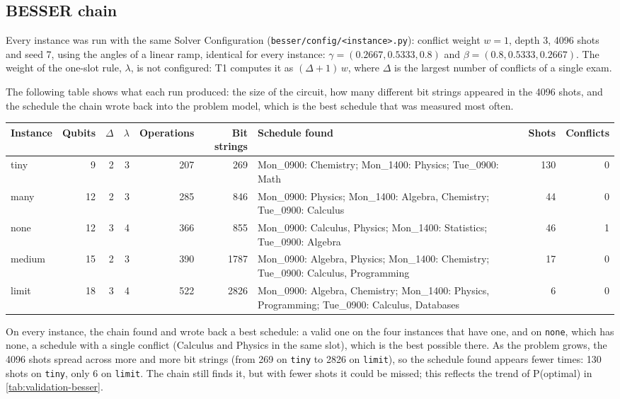\subsection*{BESSER chain}

Every instance was run with the same Solver Configuration (\texttt{besser/config/<instance>.py}): conflict weight $w = 1$, depth 3, 4096 shots and seed 7, using the angles of a linear ramp, identical for every instance: $\gamma = (0.2667, 0.5333, 0.8)$ and $\beta = (0.8, 0.5333, 0.2667)$. The weight of the one-slot rule, $\lambda$, is not configured: T1 computes it as $(\Delta + 1)\,w$, where $\Delta$ is the largest number of conflicts of a single exam.

The following table shows what each run produced: the size of the circuit, how many different bit strings appeared in the 4096 shots, and the schedule the chain wrote back into the problem model, which is the best schedule that was measured most often.

\begin{table}
	\label{tab:results-besser}
	\footnotesize
	\begin{tabularx}{\linewidth}{@{}lrrrrr>{\raggedright\arraybackslash}Xrr@{}}
		\toprule
		Instance & Qubits & $\Delta$ & $\lambda$ & Operations & Bit strings & Schedule found & Shots & Conflicts \\
		\midrule
		tiny   & 9  & 2 & 3 & 207 & 269  & Mon\_0900: Chemistry; Mon\_1400: Physics; Tue\_0900: Math                                    & 130 & 0 \\
		many   & 12 & 2 & 3 & 285 & 846  & Mon\_0900: Physics; Mon\_1400: Algebra, Chemistry; Tue\_0900: Calculus                       & 44  & 0 \\
		none   & 12 & 3 & 4 & 366 & 855  & Mon\_0900: Calculus, Physics; Mon\_1400: Statistics; Tue\_0900: Algebra                      & 46  & 1 \\
		medium & 15 & 2 & 3 & 390 & 1787 & Mon\_0900: Algebra, Physics; Mon\_1400: Chemistry; Tue\_0900: Calculus, Programming          & 17  & 0 \\
		limit  & 18 & 3 & 4 & 522 & 2826 & Mon\_0900: Algebra, Chemistry; Mon\_1400: Physics, Programming; Tue\_0900: Calculus, Databases & 6   & 0 \\
		\bottomrule
	\end{tabularx}
\end{table}

On every instance, the chain found and wrote back a best schedule: a valid one on the four instances that have one, and on \texttt{none}, which has none, a schedule with a single conflict (Calculus and Physics in the same slot), which is the best possible there. As the problem grows, the 4096 shots spread across more and more bit strings (from 269 on \texttt{tiny} to 2826 on \texttt{limit}), so the schedule found appears fewer times: 130 shots on \texttt{tiny}, only 6 on \texttt{limit}. The chain still finds it, but with fewer shots it could be missed; this reflects the trend of P(optimal) in \cref{tab:validation-besser}.